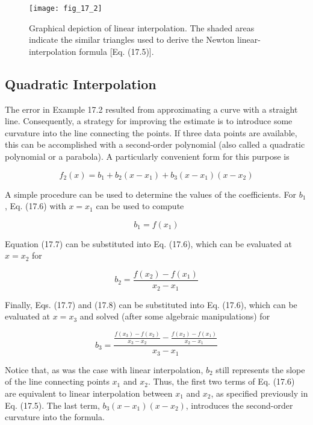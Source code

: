 \documentclass[../main.tex]{subfiles}
\begin{document}
\begin{figure}[H] 
	\centering
	\texttt{[image: fig\_17\_2]}
	\caption{\textsf{Graphical depiction of linear interpolation. The shaded areas indicate the similar triangles used
	to derive the Newton linear-interpolation formula [Eq. (17.5)].}}
	\label{fig:fig_17_2}
\end{figure}


\label{cha:cha_P_17_2_2}
\subsection{Quadratic Interpolation}

\noindent The error in Example 17.2 resulted from approximating a curve with a straight line. Consequently, a strategy for improving the estimate is to introduce some curvature into the line
connecting the points. If three data points are available, this can be accomplished with a
second-order polynomial (also called a quadratic polynomial or a parabola). A particularly
convenient form for this purpose is

\begin{equation}
	\tag{17.6}
	f_2(x) = b_1 + b_2 (x - x_1) + b_3 (x-x_1) (x - x_2)
\end{equation}

A simple procedure can be used to determine the values of the coefficients. For $b_1$,
Eq. (17.6) with $x = x_1$ can be used to compute

\begin{equation}
	\tag{17.7}
	b_1 = f(x_1)
\end{equation}

\noindent Equation (17.7) can be substituted into Eq. (17.6), which can be evaluated at $x = x_2$ for

\begin{equation}
	\tag{17.8}
	b_2 = \frac{f(x_2) - f(x_1)}{x_2 - x_1}
\end{equation}

\noindent Finally, Eqs. (17.7) and (17.8) can be substituted into Eq. (17.6), which can be evaluated at
$x = x_3$ and solved (after some algebraic manipulations) for

\begin{equation}
	\tag{17.9}
	b_3 = \frac{
		\frac{f(x_3) - f(x_2)}{x_3 - x_2} - \frac{f(x_2) - f(x_1)}{x_2 - x_1}
	}{x_3 - x_1}
\end{equation}

Notice that, as was the case with linear interpolation, $b_2$ still represents the slope of the
line connecting points $x_1$ and $x_2$. Thus, the first two terms of Eq. (17.6) are equivalent to
linear interpolation between $x_1$ and $x_2$, as specified previously in Eq. (17.5). The last term,
$b_3 (x - x_1 )(x - x_2)$, introduces the second-order curvature into the formula.
\end{document}
